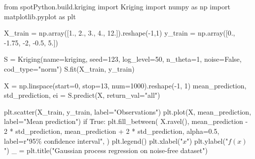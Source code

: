\documentclass[
  letterpaper,
  DIV=11,
  numbers=noendperiod]{scrreprt}
\newenvironment{Shaded}{\begin{snugshade}}{\end{snugshade}}
\newcommand{\ControlFlowTok}[1]{\textcolor[rgb]{0.00,0.23,0.31}{#1}}
\newcommand{\DecValTok}[1]{\textcolor[rgb]{0.68,0.00,0.00}{#1}}
\newcommand{\FloatTok}[1]{\textcolor[rgb]{0.68,0.00,0.00}{#1}}
\newcommand{\ImportTok}[1]{\textcolor[rgb]{0.00,0.46,0.62}{#1}}
\newcommand{\NormalTok}[1]{\textcolor[rgb]{0.00,0.23,0.31}{#1}}
\newcommand{\OperatorTok}[1]{\textcolor[rgb]{0.37,0.37,0.37}{#1}}
\newcommand{\SpecialCharTok}[1]{\textcolor[rgb]{0.37,0.37,0.37}{#1}}
\newcommand{\StringTok}[1]{\textcolor[rgb]{0.13,0.47,0.30}{#1}}
\newcommand{\VariableTok}[1]{\textcolor[rgb]{0.07,0.07,0.07}{#1}}
\newcommand{\VerbatimStringTok}[1]{\textcolor[rgb]{0.13,0.47,0.30}{#1}}
\begin{document}
\begin{Shaded}
\begin{Highlighting}[]
\ImportTok{from}\NormalTok{ spotPython.build.kriging }\ImportTok{import}\NormalTok{ Kriging}
\ImportTok{import}\NormalTok{ numpy }\ImportTok{as}\NormalTok{ np}
\ImportTok{import}\NormalTok{ matplotlib.pyplot }\ImportTok{as}\NormalTok{ plt}

\NormalTok{X\_train }\OperatorTok{=}\NormalTok{ np.array([}\FloatTok{1.}\NormalTok{, }\FloatTok{2.}\NormalTok{, }\FloatTok{3.}\NormalTok{, }\FloatTok{4.}\NormalTok{, }\FloatTok{12.}\NormalTok{]).reshape(}\OperatorTok{{-}}\DecValTok{1}\NormalTok{,}\DecValTok{1}\NormalTok{)}
\NormalTok{y\_train }\OperatorTok{=}\NormalTok{ np.array([}\FloatTok{0.}\NormalTok{, }\OperatorTok{{-}}\FloatTok{1.75}\NormalTok{, }\OperatorTok{{-}}\DecValTok{2}\NormalTok{, }\OperatorTok{{-}}\FloatTok{0.5}\NormalTok{, }\FloatTok{5.}\NormalTok{])}

\NormalTok{S }\OperatorTok{=}\NormalTok{ Kriging(name}\OperatorTok{=}\StringTok{\textquotesingle{}kriging\textquotesingle{}}\NormalTok{,  seed}\OperatorTok{=}\DecValTok{123}\NormalTok{, log\_level}\OperatorTok{=}\DecValTok{50}\NormalTok{, n\_theta}\OperatorTok{=}\DecValTok{1}\NormalTok{, noise}\OperatorTok{=}\VariableTok{False}\NormalTok{, cod\_type}\OperatorTok{=}\StringTok{"norm"}\NormalTok{)}
\NormalTok{S.fit(X\_train, y\_train)}

\NormalTok{X }\OperatorTok{=}\NormalTok{ np.linspace(start}\OperatorTok{=}\DecValTok{0}\NormalTok{, stop}\OperatorTok{=}\DecValTok{13}\NormalTok{, num}\OperatorTok{=}\DecValTok{1000}\NormalTok{).reshape(}\OperatorTok{{-}}\DecValTok{1}\NormalTok{, }\DecValTok{1}\NormalTok{)}
\NormalTok{mean\_prediction, std\_prediction, ei }\OperatorTok{=}\NormalTok{ S.predict(X, return\_val}\OperatorTok{=}\StringTok{"all"}\NormalTok{)}

\NormalTok{plt.scatter(X\_train, y\_train, label}\OperatorTok{=}\StringTok{"Observations"}\NormalTok{)}
\NormalTok{plt.plot(X, mean\_prediction, label}\OperatorTok{=}\StringTok{"Mean prediction"}\NormalTok{)}
\ControlFlowTok{if} \VariableTok{True}\NormalTok{:}
\NormalTok{    plt.fill\_between(}
\NormalTok{        X.ravel(),}
\NormalTok{        mean\_prediction }\OperatorTok{{-}} \DecValTok{2} \OperatorTok{*}\NormalTok{ std\_prediction,}
\NormalTok{        mean\_prediction }\OperatorTok{+} \DecValTok{2} \OperatorTok{*}\NormalTok{ std\_prediction,}
\NormalTok{        alpha}\OperatorTok{=}\FloatTok{0.5}\NormalTok{,}
\NormalTok{        label}\OperatorTok{=}\VerbatimStringTok{r"95}\SpecialCharTok{\% c}\VerbatimStringTok{onfidence interval"}\NormalTok{,}
\NormalTok{    )}
\NormalTok{plt.legend()}
\NormalTok{plt.xlabel(}\StringTok{"$x$"}\NormalTok{)}
\NormalTok{plt.ylabel(}\StringTok{"$f(x)$"}\NormalTok{)}
\NormalTok{\_ }\OperatorTok{=}\NormalTok{ plt.title(}\StringTok{"Gaussian process regression on noise{-}free dataset"}\NormalTok{)}
\end{Highlighting}
\end{Shaded}
\end{document}

